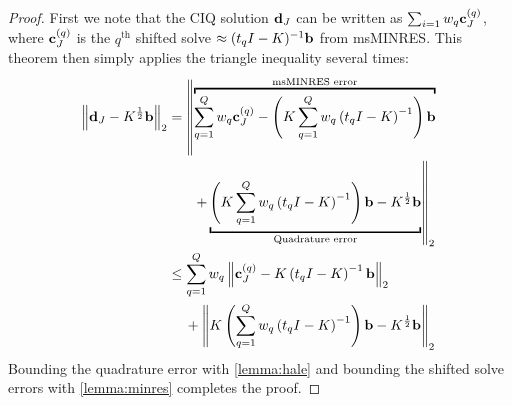 \begin{proof}
  First we note that the CIQ solution $\mathbf{d}_J$ can be written as $\sum_{i=1} w_q \mathbf{c}^{(q)}_J$, where $\mathbf{c}^{(q)}_J$ is the $q^\text{th}$ shifted solve $\approx (t_q I - K)^{-1} \mathbf{b}$ from msMINRES.
  This theorem then simply applies the triangle inequality several times:
  \begin{align*}
    \left\Vert \bd_J - \bK^{\frac 1 2} \bb \right\Vert_2
    &=
    \left\Vert \overbracket{\sum_{q=1}^Q w_q \bc^{(q)}_J - \left( \bK \sum_{q=1}^Q w_q \left( t_q \bI - \bK \right)^{-1} \right) \bb }^{\text{msMINRES error}} \right.
    \\
    &\phantom{=} \quad \left. + \underbracket{\left( \bK \sum_{q=1}^Q w_q \left( t_q \bI - \bK \right)^{-1} \right) \bb - \bK^{\frac 1 2} \bb}_{\text{Quadrature error}} \right\Vert_2
    \\
    &\leq \sum_{q=1}^Q w_q \left\Vert \bc^{(q)}_J - \bK \left( t_q \bI - \bK \right)^{-1} \bb \right\Vert_2
    \\
    &\phantom{=} \:\: + \left\Vert \bK \left( \sum_{q=1}^Q w_q \left( t_q \bI - \bK \right)^{-1} \right) \bb - \bK^{\frac 1 2} \bb \right\Vert_2
  \end{align*}
  Bounding the quadrature error with \cref{lemma:hale} and bounding the shifted solve errors with \cref{lemma:minres} completes the proof.
\end{proof}
